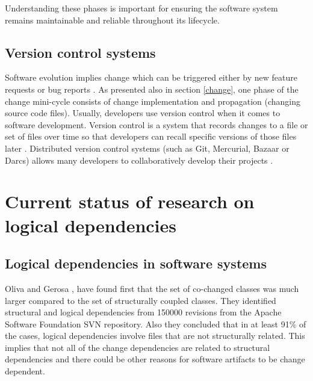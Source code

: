 Understanding these phases is important for ensuring the software system remains maintainable and reliable throughout its lifecycle.


\subsection{Version control systems}

Software evolution implies change which can be triggered either by new feature requests or bug reports \cite{articleEvolution}. As presented also in section \ref{change}, one phase of the change mini-cycle consists of change implementation and propagation (changing source code files). 
Usually, developers use version control when it comes to software development. Version control is a system that records changes to a file or set of files over time so that developers can recall specific versions of those files later \cite{svn}.
Distributed version control systems (such as Git, Mercurial, Bazaar or Darcs) allows many developers to collaboratively develop their projects \cite{7471284}.


\section{Current status of research on logical dependencies}
\label{ld-intro}

\subsection{Logical dependencies in software systems}

Oliva and Gerosa \cite{Oliva:2011:ISL:2067853.2068086}, \cite{DBLP:conf/issre/OlivaG15} have found first that the set of co-changed classes was much larger compared to the set of structurally coupled classes. They identified structural and logical dependencies from 150000 revisions from the Apache Software Foundation SVN repository. Also they concluded  that in at least 91\% of the cases, logical dependencies involve files that are not structurally related. This implies that not all of the change dependencies are related to structural dependencies and there could be other reasons for software artifacts to be change dependent.

